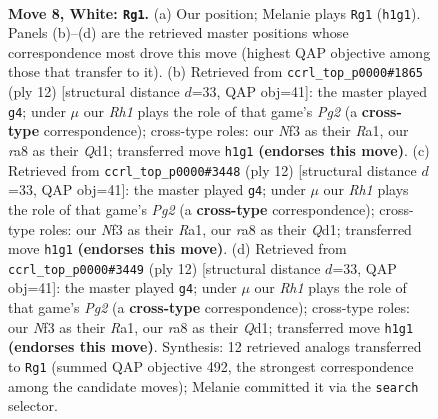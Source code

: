 \documentclass[11pt]{article}
\begin{document}
\begin{figure}[p]\centering
\begin{subfigure}{0.46\textwidth}\centering
\resizebox{\linewidth}{!}{%
\newchessgame
\chessboard[
  setfen={rnbqk2r/pp2bpp1/4pn2/2Pp3p/3P4/2N2N2/PP3PPP/R1BQKB1R w KQkq - 0 8},
  showmover=false,
  pgfstyle=straightmove, color=movearrow, markmove={h1-g1}
]}
\caption{}
\end{subfigure}\hfill
\begin{subfigure}{0.46\textwidth}\centering
\resizebox{\linewidth}{!}{%
\newchessgame
\chessboard[
  setfen={rnbqkb1r/1p3ppp/p2ppn2/8/3NP3/2N4P/PPP2PP1/R1BQKB1R w KQkq - 0 7},
  showmover=false,
  pgfstyle=straightmove, color=movearrow, markmove={g2-g4}
]}
\caption{}
\end{subfigure}
\\[4pt]
\begin{subfigure}{0.46\textwidth}\centering
\resizebox{\linewidth}{!}{%
\newchessgame
\chessboard[
  setfen={rnbqkb1r/1p3ppp/p2ppn2/8/3NP3/2N4P/PPP2PP1/R1BQKB1R w KQkq - 0 7},
  showmover=false,
  pgfstyle=straightmove, color=movearrow, markmove={g2-g4}
]}
\caption{}
\end{subfigure}\hfill
\begin{subfigure}{0.46\textwidth}\centering
\resizebox{\linewidth}{!}{%
\newchessgame
\chessboard[
  setfen={rnbqkb1r/1p3ppp/p2ppn2/8/3NP3/2N4P/PPP2PP1/R1BQKB1R w KQkq - 0 7},
  showmover=false,
  pgfstyle=straightmove, color=movearrow, markmove={g2-g4}
]}
\caption{}
\end{subfigure}
\caption{\textbf{Move 8, White: \texttt{Rg1}.} (a) Our position; Melanie plays \texttt{Rg1} (\texttt{h1g1}). Panels (b)--(d) are the retrieved master positions whose correspondence most drove this move (highest QAP objective among those that transfer to it). (b) Retrieved from \texttt{ccrl\_top\_p0000\#1865} (ply 12) [structural distance $d$=33, QAP obj=41]: the master played \texttt{g4}; under $\mu$ our \emph{Rh1} plays the role of that game's \emph{Pg2} (a \textbf{cross-type} correspondence); cross-type roles: our \emph{N}f3 as their \emph{R}a1, our \emph{r}a8 as their \emph{Q}d1; transferred move \texttt{h1g1} \textbf{(endorses this move)}. (c) Retrieved from \texttt{ccrl\_top\_p0000\#3448} (ply 12) [structural distance $d$=33, QAP obj=41]: the master played \texttt{g4}; under $\mu$ our \emph{Rh1} plays the role of that game's \emph{Pg2} (a \textbf{cross-type} correspondence); cross-type roles: our \emph{N}f3 as their \emph{R}a1, our \emph{r}a8 as their \emph{Q}d1; transferred move \texttt{h1g1} \textbf{(endorses this move)}. (d) Retrieved from \texttt{ccrl\_top\_p0000\#3449} (ply 12) [structural distance $d$=33, QAP obj=41]: the master played \texttt{g4}; under $\mu$ our \emph{Rh1} plays the role of that game's \emph{Pg2} (a \textbf{cross-type} correspondence); cross-type roles: our \emph{N}f3 as their \emph{R}a1, our \emph{r}a8 as their \emph{Q}d1; transferred move \texttt{h1g1} \textbf{(endorses this move)}. Synthesis: 12 retrieved analogs transferred to \texttt{Rg1} (summed QAP objective 492, the strongest correspondence among the candidate moves); Melanie committed it via the \texttt{search} selector.}
\label{fig:thought-m14}
\end{figure}
\end{document}
